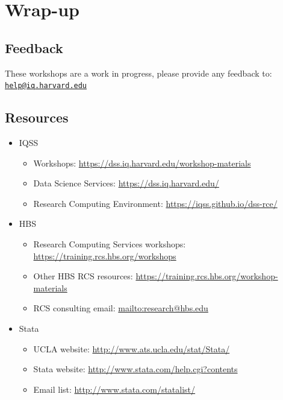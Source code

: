 \documentclass[
]{book}
\providecommand{\tightlist}{%
  \setlength{\itemsep}{0pt}\setlength{\parskip}{0pt}}
\begin{document}
\hypertarget{wrap-up-7}{%
\section{Wrap-up}\label{wrap-up-7}}

\hypertarget{feedback-7}{%
\subsection{Feedback}\label{feedback-7}}

These workshops are a work in progress, please provide any feedback to: \href{mailto:help@iq.harvard.edu}{\nolinkurl{help@iq.harvard.edu}}

\hypertarget{resources-10}{%
\subsection{Resources}\label{resources-10}}

\begin{itemize}
\tightlist
\item
  IQSS

  \begin{itemize}
  \tightlist
  \item
    Workshops: \url{https://dss.iq.harvard.edu/workshop-materials}
  \item
    Data Science Services: \url{https://dss.iq.harvard.edu/}
  \item
    Research Computing Environment: \url{https://iqss.github.io/dss-rce/}
  \end{itemize}
\item
  HBS

  \begin{itemize}
  \tightlist
  \item
    Research Computing Services workshops: \url{https://training.rcs.hbs.org/workshops}
  \item
    Other HBS RCS resources: \url{https://training.rcs.hbs.org/workshop-materials}
  \item
    RCS consulting email: \url{mailto:research@hbs.edu}
  \end{itemize}
\item
  Stata

  \begin{itemize}
  \tightlist
  \item
    UCLA website: \url{http://www.ats.ucla.edu/stat/Stata/}
  \item
    Stata website: \url{http://www.stata.com/help.cgi?contents}
  \item
    Email list: \url{http://www.stata.com/statalist/}
  \end{itemize}
\end{itemize}
\end{document}
